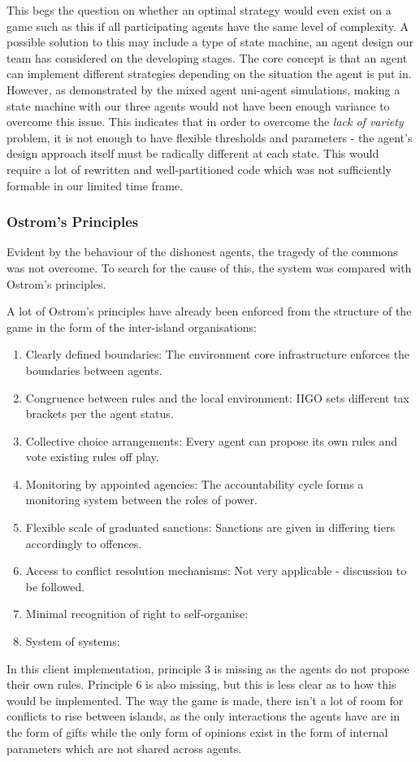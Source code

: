 This begs the question on whether an optimal strategy would even exist on a game such as this if all participating agents have the same level of complexity. A possible solution to this may include a type of state machine, an agent design our team has considered on the developing stages. The core concept is that an agent can implement different strategies depending on the situation the agent is put in. However, as demonstrated by the mixed agent uni-agent simulations, making a state machine with our three agents would not have been enough variance to overcome this issue. This indicates that in order to overcome the \emph{lack of variety} problem, it is not enough to have flexible thresholds and parameters - the agent's design approach itself must be radically different at each state. This would require a lot of rewritten and well-partitioned code which was not sufficiently formable in our limited time frame.

\subsubsection{Ostrom's Principles}
Evident by the behaviour of the dishonest agents, the tragedy of the commons was not overcome. To search for the cause of this, the system was compared with Ostrom’s principles.

A lot of Ostrom’s principles have already been enforced from the structure of the game in the form of the inter-island organisations:
\begin{enumerate}
    \item Clearly defined boundaries: The environment core infrastructure enforces the boundaries between agents.
    \item Congruence between rules and the local environment: IIGO sets different tax brackets per the agent status.
    \item Collective choice arrangements: Every agent can propose its own rules and vote existing rules off play.
    \item Monitoring by appointed agencies: The accountability cycle forms a monitoring system between the roles of power.
    \item Flexible scale of graduated sanctions: Sanctions are given in differing tiers accordingly to offences.
    \item Access to conflict resolution mechanisms: Not very applicable - discussion to be followed.
    \item Minimal recognition of right to self-organise: 
    \item System of systems: 
\end{enumerate}
In this client implementation, principle 3 is missing as the agents do not propose their own rules. Principle 6 is also missing, but this is less clear as to how this would be implemented. The way the game is made, there isn't a lot of room for conflicts to rise between islands, as the only interactions the agents have are in the form of gifts while the only form of opinions exist in the form of internal parameters which are not shared across agents.

